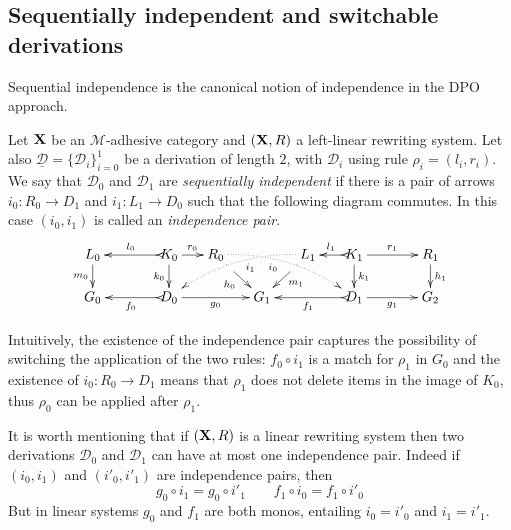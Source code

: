 \documentclass[a4paper,UKenglish,cleveref,pdftex,thm-restate,numberwithinsect]{lipics-v2021}
\def\R{\mathsf{R}}
\def\X{\textbf {\textup{X}}}
\def\G{\textbf {\textup{G}}}
\newcommand{\dder}[1]{\mathscr{#1}}
\newcommand{\der}[1]{\underline{\dder{#1}}}
\begin{document}
\subsection{Sequentially independent and switchable derivations }\label{subsec:switch}



Sequential independence is the canonical notion of independence in the DPO approach.

\begin{definition}
  \label{de:sequential-independence}
  Let $\X$ be an $\mathcal{M}$-adhesive category 
  and $(\X, \R)$ a left-linear rewriting system. 
  Let also
  $\der{D}=\{\dder{D}_i\}_{i=0}^1$ be a derivation of length $2$, with
  $\dder{D}_i$ using rule $\rho_i = (l_i,r_i)$.  We say that $\dder{D}_0$ and
  $\dder{D}_1$ are
  \emph{sequentially independent}
  if there is a pair of arrows
  $i_0\colon R_0\to D_1$ and $i_1\colon L_1\to D_0$ such that the
  following diagram commutes. In this case $(i_0,i_1)$ is called an  \emph{independence
    pair}.
  \[\xymatrix@R=16pt@C=15pt{L_0 \ar[d]_{m_0}&& K_0
      \ar[d]_{k_0}\ar@{>->}[ll]_{l_0} \ar[r]^{r_0} & R_0
      \ar@{.>}@/^.35cm/[drrr]|(.3)\hole_(.4){i_0}
      \ar[dr]|(.3)\hole_{h_0} && L_1 \ar@{.>}@/_.35cm/[dlll]^(.4){i_1}
      \ar[dl]|(.3)\hole^{m_1}& K_1 \ar[d]^{k_1}\ar@{>->}[l]_{l_1}
      \ar[rr]^{r_1} && R_1 \ar[d]^{h_1}\\G_0 && \ar@{>->}[ll]^{f_0}
      D_0 \ar[rr]_{g_0}&& G_1 && \ar@{>->}[ll]^{f_1} D_1
      \ar[rr]_{g_1}&& G_2}
  \]
\end{definition}

Intuitively, the existence of the independence pair
captures the possibility of switching the application of the two rules:
$f_0 \circ i_1$ is a match for $\rho_1$ in $G_0$ and the
existence of $i_0 : R_0 \to D_1$ means that $\rho_1$ does not delete
items in the image of $K_0$, thus $\rho_0$ can be applied after
$\rho_1$.

\begin{remark}\label{rem:uni}
	It is worth mentioning that if $(\X, \R)$ is a linear rewriting system then two derivations $\dder{D}_0$ and $\dder{D}_1$ can have at most one independence pair. Indeed if $(i_0,i_1)$ and $(i'_0, i'_1)$ are independence pairs, then
	\[g_0\circ i_1 = g_0\circ i'_1 \qquad f_1\circ i_0=f_1\circ i'_0\]
But in linear systems $g_0$ and $f_1$ are both monos, entailing $i_0=i'_0$ and $i_1=i'_1$.
\end{remark}
\end{document}
